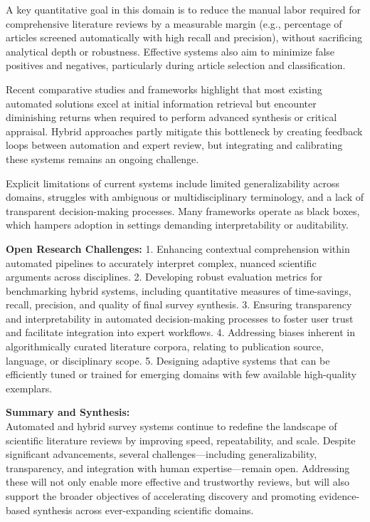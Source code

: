 \documentclass[sigconf]{acmart}
\begin{document}
A key quantitative goal in this domain is to reduce the manual labor required for comprehensive literature reviews by a measurable margin (e.g., percentage of articles screened automatically with high recall and precision), without sacrificing analytical depth or robustness. Effective systems also aim to minimize false positives and negatives, particularly during article selection and classification.

Recent comparative studies and frameworks highlight that most existing automated solutions excel at initial information retrieval but encounter diminishing returns when required to perform advanced synthesis or critical appraisal. Hybrid approaches partly mitigate this bottleneck by creating feedback loops between automation and expert review, but integrating and calibrating these systems remains an ongoing challenge.

Explicit limitations of current systems include limited generalizability across domains, struggles with ambiguous or multidisciplinary terminology, and a lack of transparent decision-making processes. Many frameworks operate as black boxes, which hampers adoption in settings demanding interpretability or auditability.

\textbf{Open Research Challenges:}
1. Enhancing contextual comprehension within automated pipelines to accurately interpret complex, nuanced scientific arguments across disciplines.
2. Developing robust evaluation metrics for benchmarking hybrid systems, including quantitative measures of time-savings, recall, precision, and quality of final survey synthesis.
3. Ensuring transparency and interpretability in automated decision-making processes to foster user trust and facilitate integration into expert workflows.
4. Addressing biases inherent in algorithmically curated literature corpora, relating to publication source, language, or disciplinary scope.
5. Designing adaptive systems that can be efficiently tuned or trained for emerging domains with few available high-quality exemplars.

\textbf{Summary and Synthesis:}\\
Automated and hybrid survey systems continue to redefine the landscape of scientific literature reviews by improving speed, repeatability, and scale. Despite significant advancements, several challenges—including generalizability, transparency, and integration with human expertise—remain open. Addressing these will not only enable more effective and trustworthy reviews, but will also support the broader objectives of accelerating discovery and promoting evidence-based synthesis across ever-expanding scientific domains.
\end{document}
